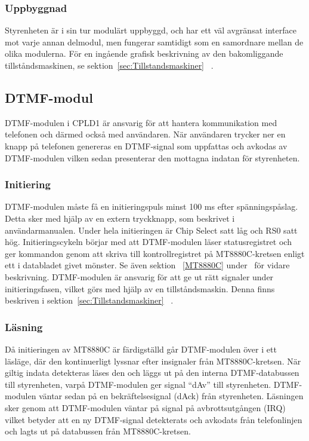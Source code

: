 \documentclass[a4paper,11pt]{article}
\begin{document}
	\subsubsection{Uppbyggnad}

	Styrenheten är i sin tur modulärt uppbyggd, och har ett väl avgränsat interface mot varje annan delmodul, men fungerar samtidigt som en samordnare mellan de olika modulerna.	För en ingående grafisk beskrivning av den bakomliggande tillståndsmaskinen, se sektion~\ref{sec:Tillstandsmaskiner} ~.

	\subsection{DTMF-modul}
		
	DTMF-modulen i CPLD1 är ansvarig för att hantera kommunikation med telefonen och därmed också med användaren.
	När användaren trycker ner en knapp på telefonen genereras en DTMF-signal som uppfattas och avkodas av DTMF-modulen vilken sedan presenterar den mottagna indatan för styrenheten.
		
	\subsubsection{Initiering}

	DTMF-modulen måste få en initieringspuls minst 100 ms efter spänningspåslag. Detta sker med hjälp av
	en extern tryckknapp, som beskrivet i användarmanualen. Under hela initieringen är Chip Select satt låg
	och RS0 satt hög. Initieringscykeln börjar med att DTMF-modulen läser statusregistret och ger kommandon genom att skriva till kontrollregistret på MT8880C-kretsen enligt ett i databladet givet mönster. Se även sektion ~\ref{MT8880C} under~ för vidare beskrivning.
	DTMF-modulen är ansvarig för att ge ut rätt signaler under initieringsfasen, vilket görs med hjälp av en tillståndsmaskin. Denna finns beskriven i sektion~\ref{sec:Tillstandsmaskiner} ~.
		
	\subsubsection{Läsning}

	Då initieringen av MT8880C är färdigställd går DTMF-modulen över i ett läsläge, där den kontinuerligt lyssnar efter insignaler från MT8880C-kretsen. När giltig indata detekteras läses den och läggs ut på den interna DTMF-databussen till styrenheten, varpå DTMF-modulen ger signal  ``dAv'' till styrenheten. DTMF-modulen väntar sedan på en bekräftelsesignal (dAck) från styrenheten. Läsningen sker genom att DTMF-modulen väntar på signal på avbrottsutgången (IRQ) vilket betyder att en ny DTMF-signal detekterats  och avkodats från telefonlinjen och lagts ut på databussen från MT8880C-kretsen.
\end{document}
